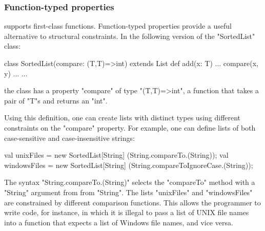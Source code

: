 
\subsubsection{Function-typed properties}

\Xten{} supports first-class functions.
Function-typed properties provide a useful alternative to
structural constraints.  In the
following version of the
\xcd"SortedList" class:
{
\begin{xten}
class SortedList(compare: (T,T)=>int)
  extends List {
    def add(x: T) {... compare(x, y) ...}
    ... }
\end{xten}}
\noindent
the class has a property \xcd"compare" of type
\xcd"(T,T)=>int", a function that takes a pair of \xcd"T"s and
returns an \xcd"int".  

Using this definition, one can create lists with distinct types
using different constraints on the \xcd"compare" property.
For example, one can define lists of
both
case-sensitive and case-insensitive strings:
{
\begin{xten}
val unixFiles
  = new SortedList[String]
      (String.compareTo.(String));
val windowsFiles
  = new SortedList[String]
      (String.compareToIgnoreCase.(String));
\end{xten}}

\noindent
The syntax \xcd"String.compareTo.(String)" selects the
\xcd"compareTo" method with a \xcd"String" argument from
from \xcd"String".
%
The lists \xcd"unixFiles" and \xcd"windowsFiles" are constrained
by different comparison functions.  This allows the programmer
to write code, for instance, in which it is illegal to pass a list of UNIX
file names into a function that expects a list of Windows file names, and
vice versa.


